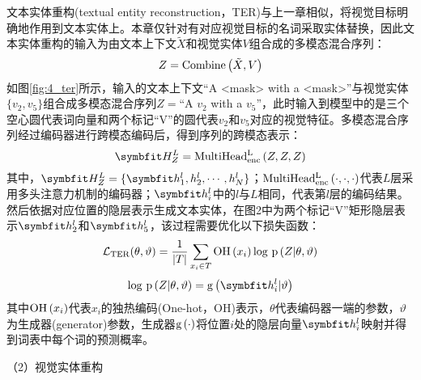 
文本实体重构(textual entity reconstruction，TER)与上一章相似，将视觉目标明确地作用到文本实体上。本章仅针对有对应视觉目标的名词采取实体替换，因此文本实体重构的输入为由文本上下文$\tilde{X}$和视觉实体$V$组合成的多模态混合序列：
\begin{equation}
Z={\rm{Combine}} \left( \tilde{X}, V \right)
\end{equation}
如图\ref{fig:4_ter}所示，输入的文本上下文“A <mask> with a <mask>”与视觉实体$\{v_2,v_5\}$组合成多模态混合序列$Z=$“A $v_2$ with a $v_5$”，此时输入到模型中的是三个空心圆代表词向量和两个标记“V”的圆代表$v_2$和$v_5$对应的视觉特征。多模态混合序列经过编码器进行跨模态编码后，得到序列的跨模态表示：
\begin{equation}
\Vector{H_Z^L}={\rm{MultiHead_{enc}^L}} \left( Z, Z, Z \right)
\end{equation}
其中，$\Vector{H_Z^L}=\{\Vector{h_1^l,h_2^l,\cdots,h_N^l}\}$；${\rm{MultiHead_{enc}^L}} \left( \cdot,\cdot,\cdot \right)$代表$L$层采用多头注意力机制的编码器；$\Vector{h_i^l}$中的$l$与$L$相同，代表第$l$层的编码结果。然后依据对应位置的隐层表示生成文本实体，在图2中为两个标记“V”矩形隐层表示${\Vector{h_2^l}}$和${\Vector{h_5^l}}$，该过程需要优化以下损失函数：
\begin{equation}
\mathcal{L}_{\rm{TER}} (\theta, \vartheta) =
    \frac{1}{{\vert}T{\vert}}
    \mathop{\sum}_{x_i \in T}
    {\rm{OH}} \left( x_i \right)
    {\rm log}{\ }{\rm p} \left( Z {\vert} \theta, \vartheta \right)
\end{equation}
\begin{equation}
{\log}{\ }{\rm p} \left( Z {\vert} \theta, \vartheta \right) =
    {\rm{g}} \left( \Vector{h_i^l} \vert \vartheta \right)
\end{equation}
其中${\rm{OH}}\left(x_i\right)$代表$x_i$的独热编码(One-hot，OH)表示，$\theta$代表编码器一端的参数，$\vartheta$为生成器(generator)参数，生成器${\rm{g}}\left(\cdot\right)$将位置$i$处的隐层向量${\Vector{h_i^l}}$映射并得到词表中每个词的预测概率。

{\sffamily （2）视觉实体重构}

